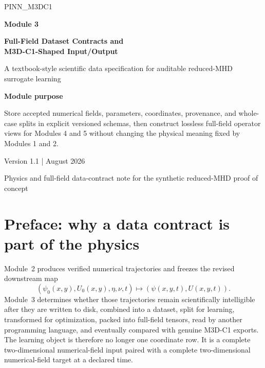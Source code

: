 \documentclass[11pt]{article}
\begin{document}
\hypersetup{pageanchor=false}

\begin{titlepage}
\centering
\vspace*{1.15cm}
{\Large\color{AccentTeal} PINN\_M3DC1}\par
\vspace{0.7cm}
{\Huge\bfseries\color{TitleBlue} Module 3}\par
\vspace{0.25cm}
{\LARGE\bfseries\color{TitleBlue} Full-Field Dataset Contracts and\\M3D-C1-Shaped Input/Output}\par
\vspace{0.9cm}
{\large A textbook-style scientific data specification for auditable reduced-MHD surrogate learning}\par
\vfill
\begin{tcolorbox}[width=0.90\textwidth,colback=SoftBlue,colframe=TitleBlue,arc=2mm]
\centering
\textbf{Module purpose}\par
\vspace{0.35em}
Store accepted numerical fields, parameters, coordinates, provenance, and whole-case splits in explicit versioned schemas, then construct lossless full-field operator views for Modules 4 and 5 without changing the physical meaning fixed by Modules 1 and 2.
\end{tcolorbox}
\vfill
{\normalsize Version 1.1 \quad |  August 2026}\par
\vspace{0.25cm}
{\small Physics and full-field data-contract note for the synthetic reduced-MHD proof of concept}\par
\end{titlepage}

\hypersetup{pageanchor=true}

\section*{Preface: why a data contract is part of the physics}

Module~2 produces verified numerical trajectories and freezes the revised downstream map
\begin{equation*}
\left(\psi_0(x,y),U_0(x,y),\eta,\nu,t\right)
\longmapsto
\left(\psi(x,y,t),U(x,y,t)\right).
\end{equation*}
Module~3 determines whether those trajectories remain scientifically intelligible after they are written to disk, combined into a dataset, split for learning, transformed for optimization, packed into full-field tensors, read by another programming language, and eventually compared with genuine M3D-C1 exports. The learning object is therefore no longer one coordinate row. It is a complete two-dimensional numerical-field input paired with a complete two-dimensional numerical-field target at a declared time.
\end{document}
